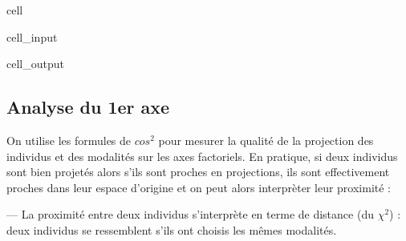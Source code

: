 \documentclass[letterpaper,10pt,french]{sphinxmanual}
\begin{document}
\begin{sphinxuseclass}{cell}
\begin{sphinxuseclass}{cell_input}
\begin{sphinxVerbatim}[commandchars=\\\{\}]
     
 
 
 
\end{sphinxVerbatim}

\end{sphinxuseclass}
\begin{sphinxuseclass}{cell_output}
\noindent{}

\end{sphinxuseclass}
\end{sphinxuseclass}

\subsection{Analyse du 1er axe}
\label{\detokenize{TP3_AFC_ACM:analyse-du-1er-axe}}
\sphinxAtStartPar
On utilise les formules de \(cos^2\) pour mesurer la qualité de la projection des individus et des modalités sur les axes factoriels.
En pratique, si deux individus sont bien projetés alors s’ils sont proches en projections, ils sont effectivement proches dans leur espace d’origine et on peut alors interprèter leur proximité :

\sphinxAtStartPar
— La proximité entre deux individus s’interprète en terme de distance (du \(\chi^2\)) : deux individus se ressemblent s’ils ont choisis les mêmes modalités.
\end{document}
